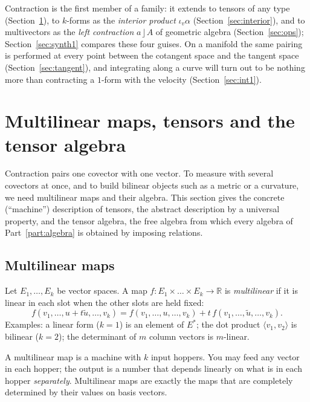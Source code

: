 \documentclass[11pt,a4paper]{article}
\numberwithin{equation}{section}
\theoremstyle{definition}
\theoremstyle{plain}
\newcommand{\R}{\mathbb{R}}
\newcommand{\lc}{\mathbin{\rfloor}}
\begin{document}
Contraction is the first member of a family: it extends to tensors of any type (Section~\ref{sec:tensors}), to
$k$-forms as the \emph{interior product} $\iota_v\alpha$ (Section~\ref{sec:interior}), and to multivectors as the
\emph{left contraction} $a\lc A$ of geometric algebra (Section~\ref{sec:ops}); Section~\ref{sec:synth1} compares these four
guises. On a manifold the same pairing is performed at every point between the cotangent space and the tangent space
(Section~\ref{sec:tangent}), and integrating along a curve will turn out to be nothing more than contracting a $1$-form with the
velocity (Section~\ref{sec:int1}).


\section{Multilinear maps, tensors and the tensor algebra}\label{sec:tensors}

Contraction pairs one covector with one vector. To measure with several covectors at once, and to build
bilinear objects such as a metric or a curvature, we need multilinear maps and their algebra. This section gives the
concrete (``machine'') description of tensors, the abstract description by a universal property, and the tensor algebra,
the free algebra from which every algebra of Part~\ref{part:algebra} is obtained by imposing relations.

\subsection{Multilinear maps}\label{sec:multilinear}
\begin{formal}
Let $E_1,\dots,E_k$ be vector spaces. A map $f:E_1\times\dots\times E_k\to\R$ is \emph{multilinear} if it is linear in each slot when the other slots are held fixed:
\[
f(v_1,\dots,u+t\tilde u,\dots,v_k)=f(v_1,\dots,u,\dots,v_k)+t\,f(v_1,\dots,\tilde u,\dots,v_k).
\]
Examples: a linear form ($k=1$) is an element of $E^*$; the dot product $\langle v_1,v_2\rangle$ is bilinear ($k=2$); the determinant of $m$ column vectors is $m$-linear.
\end{formal}

\begin{intuition}[{linear in every slot = ``a machine with several input slots''}]
A multilinear map is a machine with $k$ input hoppers. You may feed any vector in each hopper; the output is a number that depends linearly on what is in each hopper \emph{separately}. Multilinear maps are exactly the maps that are completely determined by their values on basis vectors.
\end{intuition}
\end{document}

